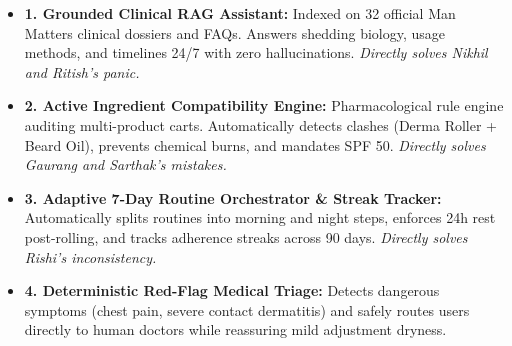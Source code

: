 \documentclass[11pt,a4paper]{article}
\begin{document}
\begin{itemize}
    \item \textbf{1. Grounded Clinical RAG Assistant:} Indexed on 32 official Man Matters clinical dossiers and FAQs. Answers shedding biology, usage methods, and timelines 24/7 with zero hallucinations. \textit{Directly solves Nikhil and Ritish's panic.}
    \item \textbf{2. Active Ingredient Compatibility Engine:} Pharmacological rule engine auditing multi-product carts. Automatically detects clashes (Derma Roller + Beard Oil), prevents chemical burns, and mandates SPF 50. \textit{Directly solves Gaurang and Sarthak's mistakes.}
    \item \textbf{3. Adaptive 7-Day Routine Orchestrator \& Streak Tracker:} Automatically splits routines into morning and night steps, enforces 24h rest post-rolling, and tracks adherence streaks across 90 days. \textit{Directly solves Rishi's inconsistency.}
    \item \textbf{4. Deterministic Red-Flag Medical Triage:} Detects dangerous symptoms (chest pain, severe contact dermatitis) and safely routes users directly to human doctors while reassuring mild adjustment dryness.
\end{itemize}
\end{document}
